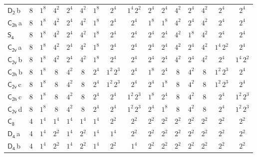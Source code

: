 \documentclass[10pt,a4paper]{article}
\numberwithin{equation}{section}
\newcommand{\grp}[1]{\mathsf{#1}}
\newcommand{\clsletter}[1]{\,{\scriptsize\color{black!55}#1}}
\begin{document}
{\begin{longtable}{@{}lrcccccccccccccc@{}}
\href{D2.pdf}{$\grp{D_{2}}$}\clsletter{b} & 8 & $1^{8}$ & $4^{2}$ & $2^{4}$ & $4^{2}$ & $1^{8}$ & $2^{4}$ & $1^{4}\,2^{2}$ & $2^{4}$ & $2^{4}$ & $4^{2}$ & $2^{4}$ & $4^{2}$ & $2^{4}$ & $2^{4}$\\
\href{C2h.pdf}{$\grp{C_{2h}}$}\clsletter{a} & 8 & $1^{8}$ & $4^{2}$ & $2^{4}$ & $4^{2}$ & $1^{8}$ & $2^{4}$ & $2^{4}$ & $1^{8}$ & $1^{8}$ & $4^{2}$ & $2^{4}$ & $4^{2}$ & $2^{4}$ & $2^{4}$\\
\href{S4.pdf}{$\grp{S_{4}}$} & 8 & $1^{8}$ & $4^{2}$ & $2^{4}$ & $4^{2}$ & $1^{8}$ & $2^{4}$ & $2^{4}$ & $2^{4}$ & $2^{4}$ & $4^{2}$ & $1^{8}$ & $4^{2}$ & $2^{4}$ & $2^{4}$\\
\href{C2v.pdf}{$\grp{C_{2v}}$}\clsletter{a} & 8 & $1^{8}$ & $4^{2}$ & $2^{4}$ & $4^{2}$ & $1^{8}$ & $2^{4}$ & $2^{4}$ & $2^{4}$ & $2^{4}$ & $4^{2}$ & $2^{4}$ & $4^{2}$ & $1^{4}\,2^{2}$ & $2^{4}$\\
\href{C2v.pdf}{$\grp{C_{2v}}$}\clsletter{b} & 8 & $1^{8}$ & $4^{2}$ & $2^{4}$ & $4^{2}$ & $1^{8}$ & $2^{4}$ & $2^{4}$ & $2^{4}$ & $2^{4}$ & $4^{2}$ & $2^{4}$ & $4^{2}$ & $2^{4}$ & $1^{4}\,2^{2}$\\
\href{C2h.pdf}{$\grp{C_{2h}}$}\clsletter{b} & 8 & $1^{8}$ & $8$ & $4^{2}$ & $8$ & $2^{4}$ & $1^{2}\,2^{3}$ & $2^{4}$ & $1^{8}$ & $2^{4}$ & $8$ & $4^{2}$ & $8$ & $1^{2}\,2^{3}$ & $2^{4}$\\
\href{C2v.pdf}{$\grp{C_{2v}}$}\clsletter{c} & 8 & $1^{8}$ & $8$ & $4^{2}$ & $8$ & $2^{4}$ & $1^{2}\,2^{3}$ & $2^{4}$ & $2^{4}$ & $1^{8}$ & $8$ & $4^{2}$ & $8$ & $1^{2}\,2^{3}$ & $2^{4}$\\
\href{C2h.pdf}{$\grp{C_{2h}}$}\clsletter{c} & 8 & $1^{8}$ & $8$ & $4^{2}$ & $8$ & $2^{4}$ & $2^{4}$ & $1^{2}\,2^{3}$ & $1^{8}$ & $2^{4}$ & $8$ & $4^{2}$ & $8$ & $2^{4}$ & $1^{2}\,2^{3}$\\
\href{C2v.pdf}{$\grp{C_{2v}}$}\clsletter{d} & 8 & $1^{8}$ & $8$ & $4^{2}$ & $8$ & $2^{4}$ & $2^{4}$ & $1^{2}\,2^{3}$ & $2^{4}$ & $1^{8}$ & $8$ & $4^{2}$ & $8$ & $2^{4}$ & $1^{2}\,2^{3}$\\
\href{C8.pdf}{$\grp{C_{8}}$} & 4 & $1^{4}$ & $1^{4}$ & $1^{4}$ & $1^{4}$ & $1^{4}$ & $2^{2}$ & $2^{2}$ & $2^{2}$ & $2^{2}$ & $2^{2}$ & $2^{2}$ & $2^{2}$ & $2^{2}$ & $2^{2}$\\
\href{D4.pdf}{$\grp{D_{4}}$}\clsletter{a} & 4 & $1^{4}$ & $2^{2}$ & $1^{4}$ & $2^{2}$ & $1^{4}$ & $1^{4}$ & $2^{2}$ & $2^{2}$ & $2^{2}$ & $2^{2}$ & $2^{2}$ & $2^{2}$ & $2^{2}$ & $2^{2}$\\
\href{D4.pdf}{$\grp{D_{4}}$}\clsletter{b} & 4 & $1^{4}$ & $2^{2}$ & $1^{4}$ & $2^{2}$ & $1^{4}$ & $2^{2}$ & $1^{4}$ & $2^{2}$ & $2^{2}$ & $2^{2}$ & $2^{2}$ & $2^{2}$ & $2^{2}$ & $2^{2}$\\

\end{longtable}}
\end{document}
